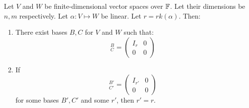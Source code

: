 \documentclass[../Main.tex]{subfiles}
\begin{document}
\begin{theorem}
    Let $V$ and $W$ be finite-dimensional vector spaces over $\mathbb{F}$. Let their dimensions be $n, m$ respectively. Let $\alpha : V \mapsto W$ be linear. Let $r = rk(\alpha)$. Then:
    \begin{enumerate}
        \item There exist bases $B, C$ for $V$ and $W$ such that:
            \begin{equation*}
                [\alpha]_C^B =
                \begin{pmatrix}
                    I_r & 0 \\
                    0 & 0
                \end{pmatrix}
            \end{equation*}
        \item If
            \begin{equation*}
                [\alpha]_{C'}^{B'} =
                \begin{pmatrix}
                    I_{r'} & 0 \\
                    0 & 0
                \end{pmatrix}
            \end{equation*}
            for some bases $B', C'$ and some $r'$, then $r' = r$.
    \end{enumerate}
    \label{thmBlockMatDecomp}
\end{theorem}
\end{document}
